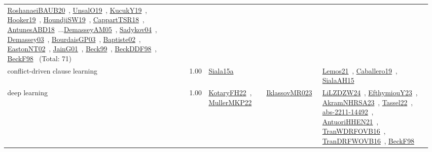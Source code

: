 {\begin{longtable}{p{3cm}r>{\raggedright\arraybackslash}p{6cm}>{\raggedright\arraybackslash}p{6cm}>{\raggedright\arraybackslash}p{8cm}}
\href{../works/RoshanaeiBAUB20.pdf}{RoshanaeiBAUB20}~\cite{RoshanaeiBAUB20}, \href{../works/UnsalO19.pdf}{UnsalO19}~\cite{UnsalO19}, \href{../works/KucukY19.pdf}{KucukY19}~\cite{KucukY19}, \href{../works/Hooker19.pdf}{Hooker19}~\cite{Hooker19}, \href{../works/HoundjiSW19.pdf}{HoundjiSW19}~\cite{HoundjiSW19}, \href{../works/CappartTSR18.pdf}{CappartTSR18}~\cite{CappartTSR18}, \href{../works/AntunesABD18.pdf}{AntunesABD18}~\cite{AntunesABD18}...\href{../works/DemasseyAM05.pdf}{DemasseyAM05}~\cite{DemasseyAM05}, \href{../works/Sadykov04.pdf}{Sadykov04}~\cite{Sadykov04}, \href{../works/Demassey03.pdf}{Demassey03}~\cite{Demassey03}, \href{../works/BourdaisGP03.pdf}{BourdaisGP03}~\cite{BourdaisGP03}, \href{../works/Baptiste02.pdf}{Baptiste02}~\cite{Baptiste02}, \href{../works/EastonNT02.pdf}{EastonNT02}~\cite{EastonNT02}, \href{../works/JainG01.pdf}{JainG01}~\cite{JainG01}, \href{../works/Beck99.pdf}{Beck99}~\cite{Beck99}, \href{../works/BeckDDF98.pdf}{BeckDDF98}~\cite{BeckDDF98}, \href{../works/BeckF98.pdf}{BeckF98}~\cite{BeckF98} (Total: 71)\\
\index{conflict-driven clause learning}\index{Algorithms!conflict-driven clause learning}conflict-driven clause learning &  1.00 & \href{../works/Siala15a.pdf}{Siala15a}~\cite{Siala15a} &  & \href{../works/Lemos21.pdf}{Lemos21}~\cite{Lemos21}, \href{../works/Caballero19.pdf}{Caballero19}~\cite{Caballero19}, \href{../works/SialaAH15.pdf}{SialaAH15}~\cite{SialaAH15}\\
\index{deep learning}\index{Algorithms!deep learning}deep learning &  1.00 & \href{../works/KotaryFH22.pdf}{KotaryFH22}~\cite{KotaryFH22}, \href{../works/MullerMKP22.pdf}{MullerMKP22}~\cite{MullerMKP22} & \href{../works/IklassovMR023.pdf}{IklassovMR023}~\cite{IklassovMR023} & \href{../works/LiLZDZW24.pdf}{LiLZDZW24}~\cite{LiLZDZW24}, \href{../works/EfthymiouY23.pdf}{EfthymiouY23}~\cite{EfthymiouY23}, \href{../works/AkramNHRSA23.pdf}{AkramNHRSA23}~\cite{AkramNHRSA23}, \href{../works/Tassel22.pdf}{Tassel22}~\cite{Tassel22}, \href{../works/abs-2211-14492.pdf}{abs-2211-14492}~\cite{abs-2211-14492}, \href{../works/AntuoriHHEN21.pdf}{AntuoriHHEN21}~\cite{AntuoriHHEN21}, \href{../works/TranWDRFOVB16.pdf}{TranWDRFOVB16}~\cite{TranWDRFOVB16}, \href{../works/TranDRFWOVB16.pdf}{TranDRFWOVB16}~\cite{TranDRFWOVB16}, \href{../works/BeckF98.pdf}{BeckF98}~\cite{BeckF98}\\

\end{longtable}}
